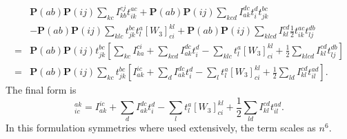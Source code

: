 \documentclass[a4paper,norsk,11pt,twoside]{report}
\begin{document}
\begin{align}
& \textbf{P}(ab) \textbf{P}(ij) \sum_{kc} I_{kb}^{cj} t_{ik}^{ac}
+ \textbf{P}(ab) \textbf{P}(ij) \sum_{kcd} I_{ak}^{dc} t_i^d t_{jk}^{bc}
\nonumber \\ &
- \textbf{P}(ab) \textbf{P}(ij) \sum_{klc} t_{jk}^{bc} t_l^a [W_3]_{ci}^{kl}
+ \textbf{P}(ab) \textbf{P}(ij) \sum_{klcd} I_{kl}^{cd} \frac{1}{2} t_{ik}^{ac} t_{lj}^{db}
\nonumber \\
= & \textbf{P}(ab) \textbf{P}(ij) t^{bc}_{jk} \left[
\sum_{kc} I_{ka}^{ci} 
+ \sum_{kcd} I_{ak}^{dc} t_i^d
- \sum_{klc} t_l^a [W_3]_{ci}^{kl}
+ \frac{1}{2} \sum_{klcd} I_{kl}^{cd} t_{lj}^{db}
\right] \nonumber \\ 
= &
\textbf{P}(ab) \textbf{P}(ij)  \sum_{kc} t^{bc}_{jk} \left[
I_{ak}^{ic} 
+ \sum_{d} I_{ak}^{dc} t_i^d
- \sum_{l} t_l^a [W_3]_{ci}^{kl}
+ \frac{1}{2} \sum_{ld} I_{kl}^{cd} t_{il}^{ad}
\right] .
\end{align}
The final form is
\begin{equation}
[W_4]_{ic}^{ak} = 
I_{ak}^{ic} 
+ \sum_{d} I_{ak}^{dc} t_i^d
- \sum_{l} t_l^a [W_3]_{ci}^{kl}
+ \frac{1}{2} \sum_{ld} I_{kl}^{cd} t_{il}^{ad} .
\label{intermedW4}
\end{equation}
In this formulation symmetries where used extensively, the term scales as $n^6$.
\end{document}
